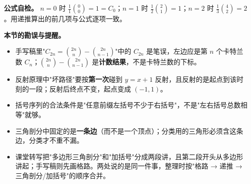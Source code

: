 \textbf{公式自检。} $n=0$ 时 $\frac1{1}\binom00=1=C_0$；$n=1$ 时 $\frac12\binom21=1$；$n=2$ 时 $\frac13\binom42=2$。用递推算出的前几项与公式逐项一致。

\textbf{本节的勘误与提醒。}
\begin{itemize}
\item 手写稿里"$C_{2n}=\binom{2n}{n}-\binom{2n}{n-1}$"中的 $C_{2n}$ 是笔误，左边应是第 $n$ 个卡特兰数 $C_n$；$\binom{2n}{n}-\binom{2n}{n-1}$ 是\textbf{计数结果}，不是卡特兰数的下标。
\item 反射原理中"坏路径"要按\textbf{第一次}碰到 $y=x+1$ 反射，且反射的是起点到该时刻的一段；反射后终点不变，起点变成 $(-1,1)$。
\item 括号序列的合法条件是"任意前缀左括号不少于右括号"，不是"左右括号总数相等"就够。
\item 三角剖分中固定的是\textbf{一条边}（而不是一个顶点）；分类用的三角形必须含这条边，分类才不重不漏。
\item 课堂转写把"多边形三角剖分"和"加括号"分成两段讲，且第二段开头从多边形讲起；手写稿则先画格路。两处说的是同一件事，整理时按"格路 → 递推 → 三角剖分/加括号"的顺序合并。
\end{itemize}
